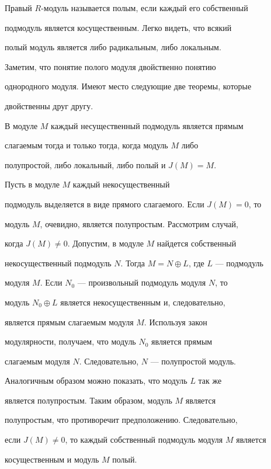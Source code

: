  


Правый $R$-модуль называется полым, если каждый его собственный 


подмодуль является косущественным. Легко видеть, что всякий 


полый модуль является либо радикальным, либо локальным. 


Заметим, что понятие полого модуля двойственно понятию 


однородного модуля. Имеют место следующие две теоремы, которые 


двойственны друг другу. 


 


\begin{thm} 


В модуле $M$ каждый несущественный подмодуль является прямым 


слагаемым тогда и только тогда, когда модуль $M$ либо 


полупростой, либо локальный, либо полый и $J(M)=M$. 


\end{thm} 


 


\begin{pf} 


Пусть в модуле $M$ каждый некосущественный 


подмодуль выделяется в виде прямого слагаемого. Если $J(M)=0$, то 


модуль $M$, очевидно, является полупростым. Рассмотрим случай, 


когда $J(M)\ne0$. Допустим, в модуле $M$ найдется собственный 


некосущественный подмодуль $N$. Тогда $M=N\oplus L$, где $L$ --- подмодуль 


модуля $M$. Если $N_0$ --- произвольный подмодуль модуля $N$, то 


модуль $N_0\oplus L$ является некосущественным и, следовательно, 


является прямым слагаемым модуля $M$. Используя закон 


модулярности, получаем, что модуль $N_0$ является прямым 


слагаемым модуля $N$. Следовательно, $N$ --- полупростой модуль. 


Аналогичным образом можно показать, что модуль $L$ так же 


является полупростым. Таким образом, модуль $M$ является 


полупростым, что противоречит предположению. Следовательно, 


если $J(M)\ne0$, то каждый собственный подмодуль модуля $M$ является 


косущественным и модуль $M$ полый. 


\end{pf} 


